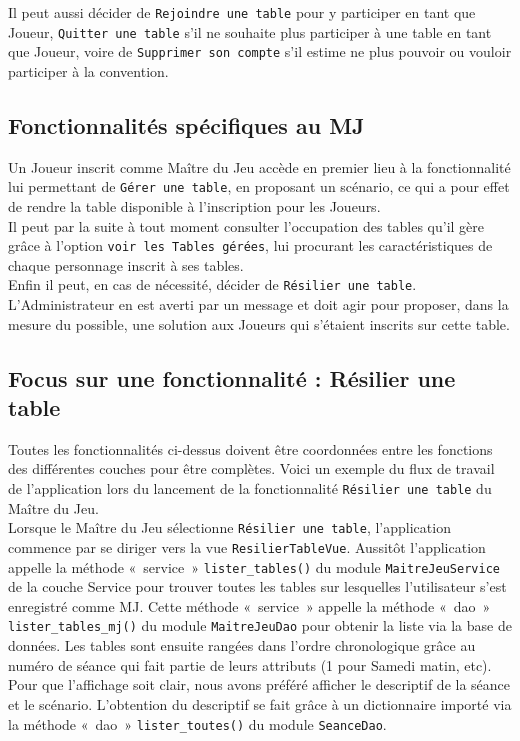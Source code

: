 \documentclass[11pt]{article}
\begin{document}
Il peut aussi décider de \texttt{Rejoindre une table} pour y participer en tant que Joueur, \texttt{Quitter une table} s'il ne souhaite plus participer à une table en tant que Joueur, voire de \texttt{Supprimer son compte} s'il estime ne plus pouvoir ou vouloir participer à la convention.



\subsection{Fonctionnalités spécifiques au MJ} 

Un Joueur inscrit comme Maître du Jeu accède en premier lieu à la fonctionnalité lui permettant de \texttt{Gérer une table}, en proposant un scénario, ce qui a pour effet de rendre la table disponible à l'inscription pour les Joueurs.\\

Il peut par la suite à tout moment consulter l'occupation des tables qu'il gère grâce à l'option \texttt{voir les Tables gérées}, lui procurant les caractéristiques de chaque personnage inscrit à ses tables.\\

Enfin il peut, en cas de nécessité, décider de \texttt{Résilier une table}. L'Administrateur en est averti par un message et doit agir pour proposer, dans la mesure du possible, une solution aux Joueurs qui s'étaient inscrits sur cette table.\\




\subsection{Focus sur une fonctionnalité : Résilier une table}

Toutes les fonctionnalités ci-dessus doivent être coordonnées entre les fonctions des différentes couches pour être complètes. Voici un exemple du flux de travail de l'application lors du lancement de la fonctionnalité \texttt{Résilier une table} du Maître du Jeu.\\

Lorsque le Maître du Jeu sélectionne \texttt{Résilier une table}, l'application commence par se diriger vers la vue \texttt{ResilierTableVue}. Aussitôt l'application appelle la méthode «~service~» \texttt{lister\_tables()} du module \texttt{MaitreJeuService} de la couche Service pour trouver toutes les tables sur lesquelles l'utilisateur s'est enregistré comme MJ. Cette méthode «~service~» appelle la méthode «~dao~» \texttt{lister\_tables\_mj()} du module \texttt{MaitreJeuDao} pour obtenir la liste via la base de données. Les tables sont ensuite rangées dans l'ordre chronologique grâce au numéro de séance qui fait partie de leurs attributs (1 pour Samedi matin, etc). Pour que l'affichage soit clair, nous avons préféré afficher le descriptif de la séance et le scénario. L'obtention du descriptif se fait grâce à un dictionnaire importé via la méthode «~dao~» \texttt{lister\_toutes()} du module \texttt{SeanceDao}.\\
\end{document}
